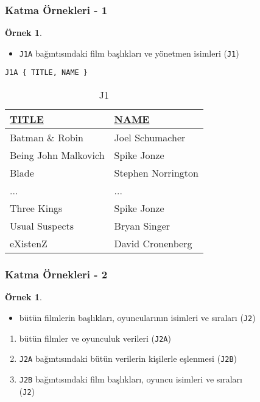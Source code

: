 \documentclass[dvipsnames]{beamer}
\theoremstyle{definition}
\theoremstyle{example}
\newtheorem{ornek}[theorem]{Örnek}
\theoremstyle{plain}
\begin{document}
\begin{frame}[fragile]
  \frametitle{Katma Örnekleri - 1}

  \begin{ornek}
    \begin{itemize}
      \item \texttt{J1A} bağıntısındaki film başlıkları ve yönetmen isimleri
         (\texttt{J1})
    \end{itemize}

    \begin{lstlisting}
J1A { TITLE, NAME }
    \end{lstlisting}

    \pause
    \vspace{-10pt}
    \begin{tiny}
    \begin{table}
      \caption{J1}
      \begin{tabular}{|l|l|}\hline
\underline{TITLE}    & \underline{NAME}\\[2pt]\hline\hline
Batman \& Robin      & Joel Schumacher \\\hline
Being John Malkovich & Spike Jonze     \\\hline
Blade                & Stephen Norrington\\\hline
...                  & ...             \\\hline
Three Kings          & Spike Jonze     \\\hline
Usual Suspects       & Bryan Singer    \\\hline
eXistenZ             & David Cronenberg\\\hline
      \end{tabular}
    \end{table}
    \end{tiny}
  \end{ornek}
\end{frame}

\begin{frame}
  \frametitle{Katma Örnekleri - 2}

  \begin{ornek}
    \begin{itemize}
      \item bütün filmlerin başlıkları, oyuncularının isimleri ve sıraları
        (\texttt{J2})
    \end{itemize}

    \pause
    \begin{enumerate}
      \item bütün filmler ve oyunculuk verileri (\texttt{J2A})

      \pause
      \item \texttt{J2A} bağıntısındaki bütün verilerin kişilerle eşlenmesi
        (\texttt{J2B})

      \pause
      \item \texttt{J2B} bağıntısındaki film başlıkları, oyuncu isimleri
	ve sıraları\\
	(\texttt{J2})
    \end{enumerate}
  \end{ornek}
\end{frame}
\end{document}
